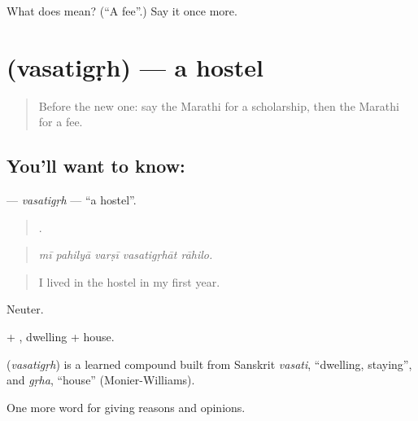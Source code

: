\begin{tcolorbox}[breakable,colback=teal!4,colframe=teal!35!black,title={Before you move on}]
What does  mean? (\textquotedblleft{}A fee\textquotedblright{}.) Say it once more.
\end{tcolorbox}
\section[\texorpdfstring{\mr{वसतिगृह} (vasatigṛh)}{वसतिगृह (vasatigṛh)}]{ (vasatigṛh) — a hostel}

\label{lesson:MR-C369-vasatigrh}



\begin{quote}
Before the new one: say the Marathi for a scholarship, then the Marathi for a fee.
\end{quote}

\subsection*{You'll want to know: }
\textbf{} — \emph{vasatigṛh} — \textquotedblleft{}a hostel\textquotedblright{}.

\begin{quote}
    .
\end{quote}

\begin{quote}
\emph{mī pahilyā varṣī vasatigṛhāt rāhilo.}
\end{quote}

\begin{quote}
I lived in the hostel in my first year.
\end{quote}

Neuter.

 + , dwelling + house.

\begin{cousinweb}
\textbf{} (\emph{vasatigṛh}) is a learned compound built from Sanskrit \emph{vasati}, \textquotedblleft{}dwelling, staying\textquotedblright{}, and \emph{gṛha}, \textquotedblleft{}house\textquotedblright{} (Monier-Williams).
\end{cousinweb}

\begin{grammarlens}[title={What you've built}]
One more word for giving reasons and opinions.
\end{grammarlens}

